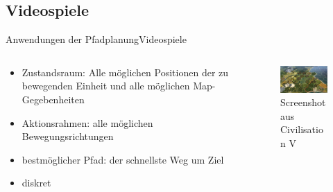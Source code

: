 \documentclass[t,aspectratio=169,dvipsnames]{beamer}
\begin{document}
\subsection{Videospiele}
\begin{frame}{Anwendungen der Pfadplanung}{Videospiele}
	\begin{columns}
		\begin{column}[T]{0.5\textwidth}
			\begin{itemize}[<+->]
				\item Zustandsraum: Alle möglichen Positionen der zu bewegenden Einheit und alle möglichen Map-Gegebenheiten
				\item Aktionsrahmen: alle möglichen Bewegungsrichtungen
				\item bestmöglicher Pfad: der schnellste Weg um Ziel
				\item diskret
			\end{itemize}
		\end{column}
		\begin{column}[T]{0.5\textwidth}
			\begin{figure}
				\includegraphics[width=6.0cm]{images/Civ5.png}
				\caption{Screenshot aus Civilisation V}
			\end{figure}
		\end{column}
	\end{columns}
\end{frame}
\end{document}
